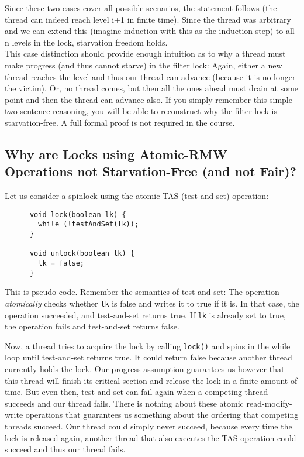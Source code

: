 \documentclass{article}
\begin{document}
    \noindent Since these two cases cover all possible scenarios, the statement follows (the thread can indeed reach level i+1 in finite time). Since the thread was arbitrary and we can extend this (imagine induction with this as the induction step) to all n levels in the lock, starvation freedom holds.\\
    This case distinction should provide enough intuition as to why a thread must make progress (and thus cannot starve) in the filter lock: Again, either a new thread reaches the level and thus our thread can advance (because it is no longer the victim). Or, no thread comes, but then all the ones ahead must drain at some point and then the thread can advance also. If you simply remember this simple two-sentence reasoning, you will be able to reconstruct why the filter lock is starvation-free. A full formal proof is not required in the course.

    \subsection{Why are Locks using Atomic-RMW Operations not Starvation-Free (and not Fair)?}
    Let us consider a spinlock using the atomic TAS (test-and-set) operation:

    \begin{verbatim}
      void lock(boolean lk) {
        while (!testAndSet(lk));
      }

      void unlock(boolean lk) {
        lk = false;
      }
    \end{verbatim}

    \noindent This is pseudo-code. Remember the semantics of test-and-set: The operation \textit{atomically} checks whether \texttt{lk} is false and writes it to true if it is. In that case, the operation succeeded, and test-and-set returns true. If \texttt{lk} is already set to true, the operation fails and test-and-set returns false.

    Now, a thread tries to acquire the lock by calling \texttt{lock()} and spins in the while loop until test-and-set returns true. It could return false because another thread currently holds the lock. Our progress assumption guarantees us however that this thread will finish its critical section and release the lock in a finite amount of time. But even then, test-and-set can fail again when a competing thread succeeds and our thread fails. There is nothing about these atomic read-modify-write operations that guarantees us something about the ordering that competing threads succeed. Our thread could simply never succeed, because every time the lock is released again, another thread that also executes the TAS operation could succeed and thus our thread fails.
\end{document}
